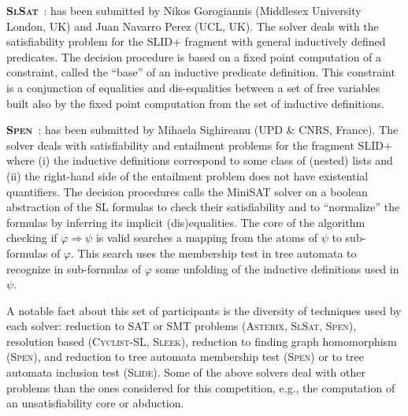 \documentclass[twoside,11pt]{article}
\newcommand{\limp}{\Rightarrow}
\newcommand{\SLRD}{\textsc{SLID}}
\newcommand{\ASTERIX}{\textsc{Asterix}}
\newcommand{\CYCLIST}{\textsc{Cyclist-SL}}
\newcommand{\SLEEK}{\textsc{Sleek}}
\newcommand{\SLIDE}{\textsc{Slide}}
\newcommand{\SLSAT}{\textsc{SlSat}}
\newcommand{\SPEN}{\textsc{Spen}}
\begin{document}
\medskip
\noindent
\textbf{\SLSAT}~\cite{BrotherstonFPG14}:
has been submitted by 
Nikos Gorogiannis (Middlesex University London, UK) 
and  Juan Navarro Perez (UCL, UK).
The solver deals with the satisfiability problem for the \SLRD+ fragment with general inductively defined predicates.
The decision procedure is based on a fixed point computation of a constraint, called the ``base'' of an inductive predicate definition. This constraint is a conjunction of equalities and dis-equalities between a set of free variables built also by the fixed point computation from the set of inductive definitions.

\medskip
\noindent
\textbf{\SPEN}~\cite{EneaLSV14,SPENsite}:
has been submitted by 
Mihaela Sighireanu (UPD \& CNRS, France).
The solver deals with satisfiability and entailment problems for the fragment \SLRD+ where 
(i) the inductive definitions correspond to some class of (nested) lists
and (ii) the right-hand side of the entailment problem does not have existential quantifiers.
The decision procedures calls the MiniSAT solver on a boolean abstraction of the SL formulas to check their satisfiability and to ``normalize'' the formulas by inferring its implicit (dis)equalities. %
The core of the algorithm checking if $\varphi\limp\psi$ is valid searches a mapping from the atoms of $\psi$ to sub-formulas of $\varphi$.
This search uses the membership test in tree automata to recognize in sub-formulas of $\varphi$ some unfolding of the inductive definitions used in $\psi$.


\medskip
A notable fact about this set of participants is the diversity of techniques used by each solver:
reduction to SAT or SMT problems (\ASTERIX, \SLSAT, \SPEN),
resolution based (\CYCLIST, \SLEEK),
reduction to finding graph homomorphism (\SPEN), and
reduction to tree automata membership test (\SPEN) or to tree automata inclusion test (\SLIDE).
%
Some of the above solvers deal with other problems than the ones considered for this competition, e.g., the computation of an unsatisfiability core or abduction.
\end{document}
